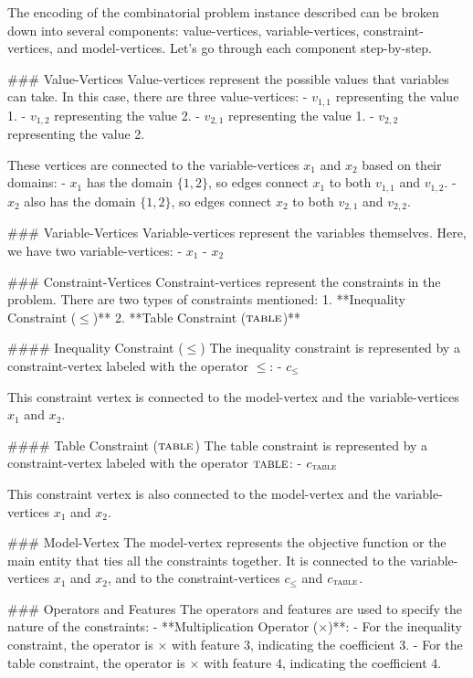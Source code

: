 The encoding of the combinatorial problem instance described can be broken down into several components: value-vertices, variable-vertices, constraint-vertices, and model-vertices. Let's go through each component step-by-step.

### Value-Vertices
Value-vertices represent the possible values that variables can take. In this case, there are three value-vertices:
- \( v_{1,1} \) representing the value 1.
- \( v_{1,2} \) representing the value 2.
- \( v_{2,1} \) representing the value 1.
- \( v_{2,2} \) representing the value 2.

These vertices are connected to the variable-vertices \( x_1 \) and \( x_2 \) based on their domains:
- \( x_1 \) has the domain \(\{1, 2\}\), so edges connect \( x_1 \) to both \( v_{1,1} \) and \( v_{1,2} \).
- \( x_2 \) also has the domain \(\{1, 2\}\), so edges connect \( x_2 \) to both \( v_{2,1} \) and \( v_{2,2} \).

### Variable-Vertices
Variable-vertices represent the variables themselves. Here, we have two variable-vertices:
- \( x_1 \)
- \( x_2 \)

### Constraint-Vertices
Constraint-vertices represent the constraints in the problem. There are two types of constraints mentioned:
1. **Inequality Constraint (\(\leq\))**
2. **Table Constraint (\(\textsc{table}\))**

#### Inequality Constraint (\(\leq\))
The inequality constraint is represented by a constraint-vertex labeled with the operator \(\leq\):
- \( c_{\leq} \)

This constraint vertex is connected to the model-vertex and the variable-vertices \( x_1 \) and \( x_2 \).

#### Table Constraint (\(\textsc{table}\))
The table constraint is represented by a constraint-vertex labeled with the operator \(\textsc{table}\):
- \( c_{\textsc{table}} \)

This constraint vertex is also connected to the model-vertex and the variable-vertices \( x_1 \) and \( x_2 \).

### Model-Vertex
The model-vertex represents the objective function or the main entity that ties all the constraints together. It is connected to the variable-vertices \( x_1 \) and \( x_2 \), and to the constraint-vertices \( c_{\leq} \) and \( c_{\textsc{table}} \).

### Operators and Features
The operators and features are used to specify the nature of the constraints:
- **Multiplication Operator (\(\times\))**:
  - For the inequality constraint, the operator is \(\times\) with feature 3, indicating the coefficient 3.
  - For the table constraint, the operator is \(\times\) with feature 4, indicating the coefficient 4.

